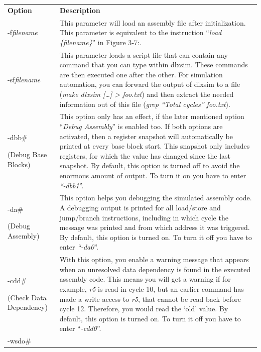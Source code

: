\documentclass[
]{article}
\begin{document}
\begin{longtable}[]{@{}ll@{}}
\toprule
\endhead
\textbf{Option} & \textbf{Description}\tabularnewline
-f\emph{filename} & This parameter will load an assembly file after
initialization. This parameter is equivalent to the instruction
``\emph{load \{filename\}}'' in Figure 3‑7:.\tabularnewline
-sf\emph{filename} & This parameter loads a script file that can contain
any command that you can type within dlxsim. These commands are then
executed one after the other. For simulation automation, you can forward
the output of dlxsim to a file (\emph{make dlxsim {[}\ldots{]}
\textgreater{} foo.txt}) and then extract the needed information out of
this file (\emph{grep ``Total cycles'' foo.txt}).\tabularnewline
\begin{minipage}[t]{0.47\columnwidth}\raggedright
-dbb\#

(Debug Base Blocks)\strut
\end{minipage} & \begin{minipage}[t]{0.47\columnwidth}\raggedright
This option only has an effect, if the later mentioned option
``\emph{Debug Assembly}'' is enabled too. If both options are activated,
then a register snapshot will automatically be printed at every base
block start. This snapshot only includes registers, for which the value
has changed since the last snapshot. By default, this option is turned
off to avoid the enormous amount of output. To turn it on you have to
enter \emph{``-dbb1}''.\strut
\end{minipage}\tabularnewline
\begin{minipage}[t]{0.47\columnwidth}\raggedright
-da\#

(Debug Assembly)\strut
\end{minipage} & \begin{minipage}[t]{0.47\columnwidth}\raggedright
This option helps you debugging the simulated assembly code. A debugging
output is printed for all load/store and jump/branch instructions,
including in which cycle the message was printed and from which address
it was triggered. By default, this option is turned on. To turn it off
you have to enter \emph{``-da0}''.\strut
\end{minipage}\tabularnewline
\begin{minipage}[t]{0.47\columnwidth}\raggedright
-cdd\#

(Check Data Dependency)\strut
\end{minipage} & \begin{minipage}[t]{0.47\columnwidth}\raggedright
With this option, you enable a warning message that appears when an
unresolved data dependency is found in the executed assembly code. This
means you will get a warning if for example, \emph{r5} is read in cycle
10, but an earlier command has made a write access to \emph{r5}, that
cannot be read back before cycle 12. Therefore, you would read the `old'
value. By default, this option is turned on. To turn it off you have to
enter ``\emph{-cdd0}''.\strut
\end{minipage}\tabularnewline
\begin{minipage}[t]{0.47\columnwidth}\raggedright
-wsdo\#


\end{minipage}
\end{longtable}
\end{document}
